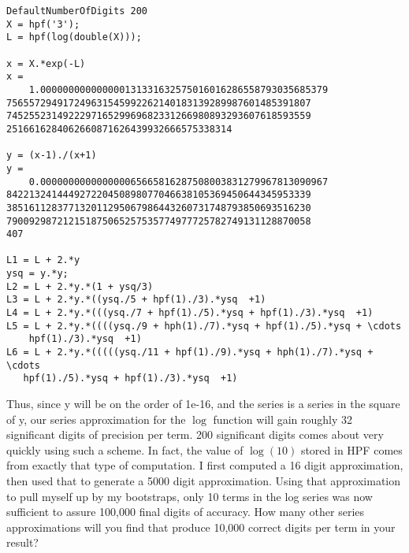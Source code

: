\documentclass[a4paper,12pt]{article}
\begin{document}
\begin{lstlisting}
DefaultNumberOfDigits 200
X = hpf('3');
L = hpf(log(double(X)));

x = X.*exp(-L)
x =
    1.000000000000000131331632575016016286558793035685379
756557294917249631545992262140183139289987601485391807
745255231492229716529969682331266980893293607618593559
2516616284062660871626439932666575338314

y = (x-1)./(x+1)
y =
    0.000000000000000065665816287508003831279967813090967
842213241444927220450898077046638105369450644345953339
385161128377132011295067986443260731748793850693516230
790092987212151875065257535774977725782749131128870058
407

L1 = L + 2.*y
ysq = y.*y;
L2 = L + 2.*y.*(1 + ysq/3)
L3 = L + 2.*y.*((ysq./5 + hpf(1)./3).*ysq  +1)
L4 = L + 2.*y.*(((ysq./7 + hpf(1)./5).*ysq + hpf(1)./3).*ysq  +1)
L5 = L + 2.*y.*((((ysq./9 + hph(1)./7).*ysq + hpf(1)./5).*ysq + \cdots
    hpf(1)./3).*ysq  +1)
L6 = L + 2.*y.*(((((ysq./11 + hpf(1)./9).*ysq + hph(1)./7).*ysq + \cdots
   hpf(1)./5).*ysq + hpf(1)./3).*ysq  +1)
\end{lstlisting}

Thus, since y will be on the order of 1e-16, and the series is a series in the square of y, our series approximation for the $\log$ function will gain roughly 32 significant digits of precision per term. 200 significant digits comes about very quickly using such a scheme. In fact, the value of $\log(10)$ stored in HPF comes from exactly that type of computation. I first computed a 16 digit approximation, then used that to generate a 5000 digit approximation. Using that approximation to pull myself up by my bootstraps, only 10 terms in the log series was now sufficient to assure 100,000 final digits of accuracy. How many other series approximations will you find that produce 10,000 correct digits per term in your result?
\end{document}
